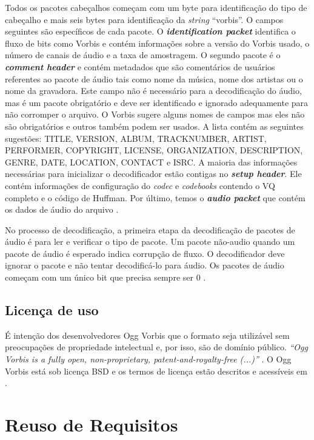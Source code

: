 Todos os pacotes cabeçalhos começam com um byte para identificação do tipo de cabeçalho e mais seis bytes para identificação da \textit{string} ``vorbis''. O campos seguintes são específicos de cada pacote. O \textbf{\textit{identification packet}} identifica o fluxo de bits como Vorbis e contém informações sobre a versão do Vorbis usado, o número de canais de áudio e a taxa de amostragem. O segundo pacote é o \textbf{\textit{comment header}} e contém metadados que são comentários de usuários referentes ao pacote de áudio tais como nome da música, nome dos artistas ou o nome da gravadora. Este campo não é necessário para a decodificação do áudio, mas é um pacote obrigatório e deve ser identificado e ignorado adequamente para não corromper o arquivo. O Vorbis sugere alguns nomes de campos mas eles não são obrigatórios e outros também podem ser usados. A lista contém as seguintes sugestões: TITLE, VERSION, ALBUM, TRACKNUMBER, ARTIST, PERFORMER, COPYRIGHT, LICENSE, ORGANIZATION, DESCRIPTION, GENRE, DATE, LOCATION, CONTACT e ISRC. A maioria das informações necessárias para inicializar o decodificador estão contigas no \textit{\textbf{setup header}}. Ele contém informações de configuração do \textit{codec} e \textit{codebooks} contendo o VQ completo e o código de Huffman. Por último, temos o \textbf{\textit{audio packet}} que contém os dados de áudio do arquivo \cite{vorbis}.

No processo de decodificação, a primeira etapa da decodificação de pacotes de áudio é para ler e verificar o tipo de pacote. Um pacote não-audio quando um pacote de áudio é esperado indica corrupção de fluxo. O decodificador deve ignorar o pacote e não tentar decodificá-lo para áudio. Os pacotes de áudio começam com um único bit que precisa sempre ser 0 \cite{vorbis}.

\subsection{Licença de uso}

É intenção dos desenvolvedores Ogg Vorbis que o formato seja utilizável sem preocupações de propriedade intelectual e, por isso, são de domínio público. \textit{``Ogg Vorbis is a fully open, non-proprietary, patent-and-royalty-free (...)''} \cite{license}. O Ogg Vorbis está sob licença BSD e os termos de licença estão descritos e acessíveis em \cite{licenseterms}.

\section{Reuso de Requisitos}

